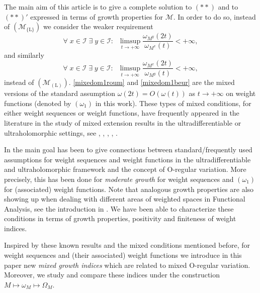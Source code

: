 \documentclass[10pt]{amsart}%
\numberwithin{equation}{section}
\theoremstyle{plain}
\begin{document}
The main aim of this article is to give a complete solution to $(**)$ and to $(**)'$ expressed in terms of growth properties for $\mathcal{M}$. In order to do so, instead of \hyperlink{R-L}{$(\mathcal{M}_{\{\text{L}\}})$} we consider the weaker requirement
\begin{equation}\label{mixedom1roum}
\forall\;x\in\mathcal{I}\;\exists\;y\in\mathcal{I}:\;\;\limsup_{t\rightarrow+\infty}\frac{\omega_{M^y}(2t)}{\omega_{M^x}(t)}<+\infty,
\end{equation}
and similarly
\begin{equation}\label{mixedom1beur}
\forall\;x\in\mathcal{I}\;\exists\;y\in\mathcal{I}:\;\;\limsup_{t\rightarrow+\infty}\frac{\omega_{M^x}(2t)}{\omega_{M^y}(t)}<+\infty,
\end{equation}
instead of \hyperlink{B-L}{$(\mathcal{M}_{(\text{L})})$}. \eqref{mixedom1roum} and \eqref{mixedom1beur} are the mixed versions of the standard assumption $\omega(2t)=O(\omega(t))$ as $t\rightarrow+\infty$ on weight functions (denoted by \hyperlink{om1}{$(\omega_1)$} in this work). These types of mixed conditions, for either weight sequences or weight functions, have frequently appeared in the literature in the study of mixed extension results in the ultradifferentiable or ultraholomorphic settings, see \cite{ChaumatChollet94}, \cite{surjectivity}, \cite{mixedramisurj}, \cite{mixedsectorialextensions}, \cite{mixedsectorialextensionsbeur}.\vspace{6pt}

In \cite{index} the main goal has been to give connections between standard/frequently used assumptions for weight sequences and weight functions in the ultradifferentiable and ultraholomorphic framework and the concept of O-regular variation. More precisely, this has been done for {\itshape moderate growth} for weight sequences and \hyperlink{om1}{$(\omega_1)$} for (associated) weight functions. Note that analogous growth properties are also showing up when dealing with different areas of weighted spaces in Functional Analysis, see the introduction in \cite{index}. We have been able to characterize these conditions in terms of growth properties, positivity and finiteness of weight indices.

Inspired by these known results and the mixed conditions mentioned before, for weight sequences and (their associated) weight functions we introduce in this paper new {\itshape mixed growth indices} which are related to mixed O-regular variation. Moreover, we study and compare these indices under the construction $M\mapsto\omega_M\mapsto\Omega_M$.\vspace{6pt}
\end{document}
